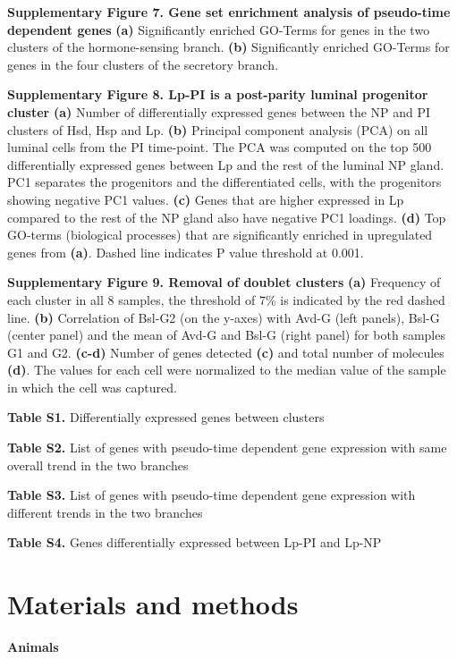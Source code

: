 \documentclass[titlepage, 12pt, oneside]{amsart}
\begin{document}
\textbf{Supplementary Figure 7. Gene set enrichment analysis of pseudo-time dependent genes}
\textbf{(a)} Significantly enriched GO-Terms for genes in the two clusters of the hormone-sensing branch.
\textbf{(b)} Significantly enriched GO-Terms for genes in the four clusters of the secretory branch.

\textbf{Supplementary Figure 8. Lp-PI is a post-parity luminal progenitor cluster}
\textbf{(a)} Number of differentially expressed genes between the NP and PI clusters of Hsd, Hsp and Lp.
\textbf{(b)} Principal component analysis (PCA) on all luminal cells from the PI time-point.
The PCA was computed on the top 500 differentially expressed genes between Lp and the rest of the luminal NP gland.
PC1 separates the progenitors and the differentiated cells, with the progenitors showing negative PC1 values.
\textbf{(c)} Genes that are higher expressed in Lp compared to the rest of the NP gland also have negative PC1 loadings.
\textbf{(d)} Top GO-terms (biological processes) that are significantly enriched in upregulated genes from \textbf{(a)}.
Dashed line indicates P value threshold at 0.001.

\textbf{Supplementary Figure 9. Removal of doublet clusters}
\textbf{(a)} Frequency of each cluster in all 8 samples, the threshold of 7\% is indicated by the red dashed line.
\textbf{(b)} Correlation of Bsl-G2 (on the y-axes) with Avd-G (left panels), Bsl-G (center panel) and the mean of Avd-G and Bsl-G (right panel) for both samples G1 and G2.
\textbf{(c-d)} Number of genes detected \textbf{(c)} and total number of molecules \textbf{(d)}. The values for each cell were normalized to the median value of the sample in which the cell was captured.

\textbf{Table S1.} Differentially expressed genes between clusters

\textbf{Table S2.} List of genes with pseudo-time dependent gene
expression with same overall trend in the two branches

\textbf{Table S3.} List of genes with pseudo-time dependent gene
expression with different trends in the two branches

\textbf{Table S4.} Genes differentially expressed between Lp-PI and Lp-NP

\section{Materials and methods}

\textbf{Animals}
\end{document}
